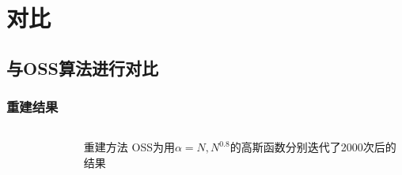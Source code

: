 \documentclass[12pt,aspectratio=169]{beamer} %
\begin{document}
\section{对比}

\subsection{与OSS算法进行对比}

\begin{frame}
    \frametitle{重建结果}
    \begin{columns}
        \begin{column}{0.7\textwidth}
            \begin{figure}
                \setcounter{subfigure}{0}
                \qquad
            \end{figure}
        \end{column}
        \begin{column}{0.3\textwidth}
            \begin{block}{重建方法}
                OSS为用$\alpha=N,N^{0.8}$的高斯函数分别迭代了2000次后的结果
            \end{block}
        \end{column}
    \end{columns}
\end{frame}
\end{document}
